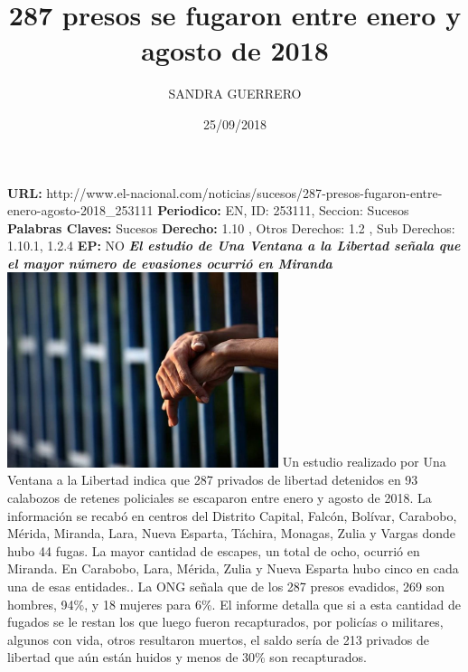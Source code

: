 \documentclass{article}%
\title{\textbf{287 presos se fugaron entre enero y agosto de 2018}}%
\author{SANDRA GUERRERO}%
\date{25/09/2018}%
\begin{document}
%
\normalsize%
\maketitle%
\textbf{URL: }%
http://www.el{-}nacional.com/noticias/sucesos/287{-}presos{-}fugaron{-}entre{-}enero{-}agosto{-}2018\_253111\newline%
%
\textbf{Periodico: }%
EN, %
ID: %
253111, %
Seccion: %
Sucesos\newline%
%
\textbf{Palabras Claves: }%
Sucesos\newline%
%
\textbf{Derecho: }%
1.10%
, Otros Derechos: %
1.2%
, Sub Derechos: %
1.10.1, 1.2.4%
\newline%
%
\textbf{EP: }%
NO\newline%
\newline%
%
\textbf{\textit{El estudio de Una Ventana a la Libertad señala que el mayor número de evasiones ocurrió en Miranda}}%
\newline%
\newline%
%
\includegraphics[width=300px]{116.jpg}%
\newline%
%
Un estudio realizado por Una Ventana a la Libertad indica que 287 privados de libertad detenidos en 93 calabozos de retenes policiales se escaparon entre enero y agosto de 2018.%
\newline%
%
La información se recabó en centros del Distrito Capital, Falcón, Bolívar, Carabobo, Mérida, Miranda, Lara, Nueva Esparta, Táchira, Monagas, Zulia y Vargas donde hubo 44 fugas.%
\newline%
%
La mayor cantidad de escapes, un total de ocho, ocurrió en Miranda. En Carabobo, Lara, Mérida, Zulia y Nueva Esparta hubo cinco en cada una de esas entidades..%
\newline%
%
La ONG señala que de los 287 presos evadidos, 269 son hombres, 94\%, y 18 mujeres para 6\%.%
\newline%
%
El informe detalla que si a esta cantidad de fugados se le restan los que luego fueron recapturados, por policías o militares, algunos con vida, otros resultaron muertos, el saldo sería de 213 privados de libertad que aún están huidos y menos de 30\% son recapturados.%
\end{document}
